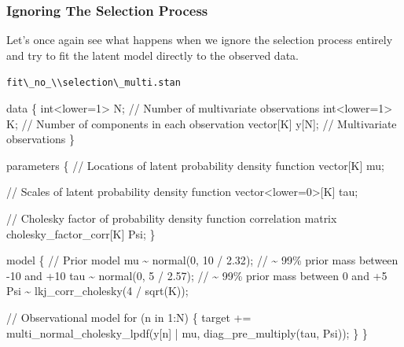 \documentclass[
  letterpaper,
  DIV=11,
  numbers=noendperiod]{scrartcl}
\newenvironment{Shaded}{\begin{snugshade}}{\end{snugshade}}
\newcommand{\CommentTok}[1]{\textcolor[rgb]{0.37,0.37,0.37}{#1}}
\newcommand{\ControlFlowTok}[1]{\textcolor[rgb]{0.00,0.23,0.31}{#1}}
\newcommand{\DataTypeTok}[1]{\textcolor[rgb]{0.68,0.00,0.00}{#1}}
\newcommand{\DecValTok}[1]{\textcolor[rgb]{0.68,0.00,0.00}{#1}}
\newcommand{\FloatTok}[1]{\textcolor[rgb]{0.68,0.00,0.00}{#1}}
\newcommand{\KeywordTok}[1]{\textcolor[rgb]{0.00,0.23,0.31}{#1}}
\newcommand{\NormalTok}[1]{\textcolor[rgb]{0.00,0.23,0.31}{#1}}
\begin{document}
\subsubsection{Ignoring The Selection
Process}\label{ignoring-the-selection-process-2}

Let's once again see what happens when we ignore the selection process
entirely and try to fit the latent model directly to the observed data.

\begin{codelisting}

\caption{\texttt{fit\textbackslash\_no\_\textbackslash\textbackslash selection\textbackslash\_multi.stan}}

\begin{Shaded}
\begin{Highlighting}[]
\KeywordTok{data}\NormalTok{ \{}
  \DataTypeTok{int}\NormalTok{\textless{}}\KeywordTok{lower}\NormalTok{=}\DecValTok{1}\NormalTok{\textgreater{} N; }\CommentTok{// Number of multivariate observations}
  \DataTypeTok{int}\NormalTok{\textless{}}\KeywordTok{lower}\NormalTok{=}\DecValTok{1}\NormalTok{\textgreater{} K; }\CommentTok{// Number of components in each observation}
  \DataTypeTok{vector}\NormalTok{[K] y[N]; }\CommentTok{// Multivariate observations}
\NormalTok{\}}

\KeywordTok{parameters}\NormalTok{ \{}
  \CommentTok{// Locations of latent probability density function}
  \DataTypeTok{vector}\NormalTok{[K] mu;}

  \CommentTok{// Scales of latent probability density function}
  \DataTypeTok{vector}\NormalTok{\textless{}}\KeywordTok{lower}\NormalTok{=}\DecValTok{0}\NormalTok{\textgreater{}[K] tau;}

  \CommentTok{// Cholesky factor of probability density function correlation matrix}
  \DataTypeTok{cholesky\_factor\_corr}\NormalTok{[K] Psi;}
\NormalTok{\}}

\KeywordTok{model}\NormalTok{ \{}
  \CommentTok{// Prior model}
\NormalTok{  mu \textasciitilde{} normal(}\DecValTok{0}\NormalTok{, }\DecValTok{10}\NormalTok{ / }\FloatTok{2.32}\NormalTok{);  }\CommentTok{// \textasciitilde{} 99\% prior mass between {-}10 and +10}
\NormalTok{  tau \textasciitilde{} normal(}\DecValTok{0}\NormalTok{, }\DecValTok{5}\NormalTok{ / }\FloatTok{2.57}\NormalTok{);  }\CommentTok{// \textasciitilde{} 99\% prior mass between 0 and +5}
\NormalTok{  Psi \textasciitilde{} lkj\_corr\_cholesky(}\DecValTok{4}\NormalTok{ / sqrt(K));}
  
  \CommentTok{// Observational model}
  \ControlFlowTok{for}\NormalTok{ (n }\ControlFlowTok{in} \DecValTok{1}\NormalTok{:N) \{}
    \KeywordTok{target +=}\NormalTok{ multi\_normal\_cholesky\_lpdf(y[n] | mu,}
\NormalTok{                                                diag\_pre\_multiply(tau, Psi));}
\NormalTok{  \}}
\NormalTok{\}}


\end{Highlighting}
\end{Shaded}
\end{codelisting}
\end{document}
